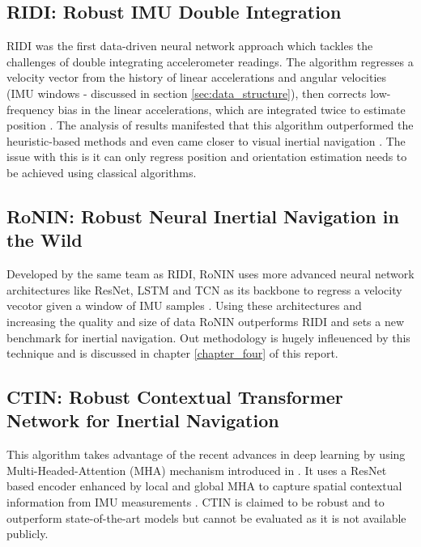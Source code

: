\subsection{RIDI: Robust IMU Double Integration}
RIDI was the first data-driven neural network approach which tackles the challenges of double integrating accelerometer readings. The algorithm regresses a velocity vector from the history of linear accelerations and angular velocities (IMU windows - discussed in section \ref{sec:data_structure}), then corrects low-frequency bias in the linear accelerations, which are integrated twice to estimate position \citep{yan2018ridi}. The analysis of results manifested that this algorithm outperformed the heuristic-based methods and even came closer to visual inertial navigation \citep{yan2018ridi}. The issue with this is it can only regress position and orientation estimation needs to be achieved using classical algorithms.

\subsection{RoNIN: Robust Neural Inertial Navigation in the Wild}
Developed by the same team as RIDI, RoNIN uses more advanced neural network architectures like ResNet, LSTM and TCN as its backbone to regress a velocity vecotor given a window of IMU samples \citep{herath2020ronin}. Using these architectures and increasing the quality and size of data RoNIN outperforms RIDI and sets a new benchmark for inertial navigation. Out methodology is hugely infleuenced by this technique and is discussed in chapter \ref{chapter_four} of this report.
\subsection{CTIN: Robust Contextual Transformer Network for Inertial Navigation}
This algorithm takes advantage of the recent advances in deep learning by using Multi-Headed-Attention (MHA) mechanism introduced in \citep{vaswani2017attention}. It uses a ResNet based encoder enhanced by local and global MHA to capture spatial contextual information from IMU measurements \citep{rao2022ctin}. CTIN is claimed to be robust and to outperform state-of-the-art models but cannot be evaluated as it is not available publicly.



